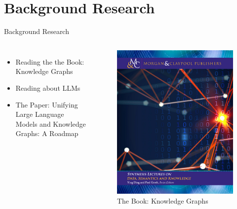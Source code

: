 \documentclass[aspectratio=169,xcolor=dvipsnames]{beamer}
\begin{document}
\section{Background Research}
\begin{frame}{Background Research}
    \begin{columns}[c]
    \begin{itemize}
        \item Reading the the Book: Knowledge Graphs \cite{hogan_knowledge_2022}
        \item Reading about LLMs 
        \item The Paper: Unifying Large Language Models and Knowledge Graphs: A Roadmap \cite{pan_unifying_2024}
    \end{itemize}
        \begin{figure}
        \centering
        \includegraphics[height=0.5\textheight]{pictures/kgbook.jpg}
        \caption{The Book: Knowledge Graphs}
        \label{fig:kgbook}
    \end{figure}
    \end{columns}
\end{frame}
\end{document}
